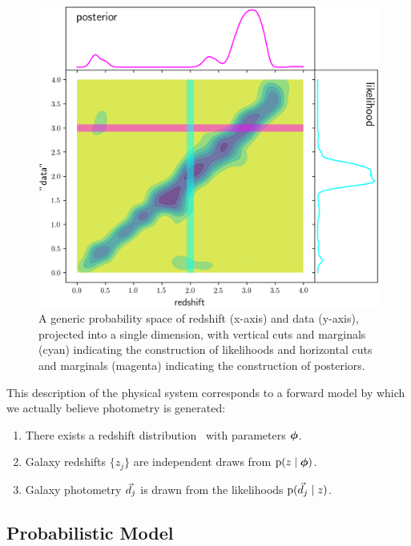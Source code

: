 \begin{figure}
	\begin{center}
		\includegraphics[width=\textwidth]{figures/chippr/jain05.png}
		\caption{
			A generic probability space of redshift (x-axis) and data (y-axis), projected into a single dimension, with vertical cuts and marginals (cyan) indicating the construction of likelihoods and horizontal cuts and marginals (magenta) indicating the construction of posteriors.
		}
	\end{center}
\end{figure}

This description of the physical system corresponds to a forward model by which we actually believe photometry is generated:
\begin{enumerate}
	\item There exists a redshift distribution \nz\ with parameters ${\boldsymbol{\phi}}$.
	\item Galaxy redshifts $\{z_{j}\}$ are independent draws from $\mathrm{p}(z \mid {\ensuremath{\boldsymbol{\phi}}})$.
	\item Galaxy photometry $\vec{d}_{j}$ is drawn from the likelihoods $\mathrm{p}(\vec{d}_{j} \mid z)$.
\end{enumerate}

\subsection{Probabilistic Model}

